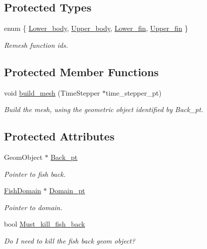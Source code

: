 \subsection*{Protected Types}
\begin{DoxyCompactItemize}
\item 
enum \{ \hyperlink{classoomph_1_1FishMesh_a4a4137c4add890a283e51651c5c47f62a3d3771209da5e9d30eedf957678f24fb}{Lower\+\_\+body}, 
\hyperlink{classoomph_1_1FishMesh_a4a4137c4add890a283e51651c5c47f62aee1779e3610fcc506554edb97df12b81}{Upper\+\_\+body}, 
\hyperlink{classoomph_1_1FishMesh_a4a4137c4add890a283e51651c5c47f62a616ba7504cd0d8970e1e275579f5606d}{Lower\+\_\+fin}, 
\hyperlink{classoomph_1_1FishMesh_a4a4137c4add890a283e51651c5c47f62a773d3896b889d4f05ed5902482650da1}{Upper\+\_\+fin}
 \}\begin{DoxyCompactList}\small\item\em Remesh function ids. \end{DoxyCompactList}
\end{DoxyCompactItemize}
\subsection*{Protected Member Functions}
\begin{DoxyCompactItemize}
\item 
void \hyperlink{classoomph_1_1FishMesh_aabde81364817d938f0924997bf4f63cc}{build\+\_\+mesh} (Time\+Stepper $\ast$time\+\_\+stepper\+\_\+pt)
\begin{DoxyCompactList}\small\item\em Build the mesh, using the geometric object identified by Back\+\_\+pt. \end{DoxyCompactList}\end{DoxyCompactItemize}
\subsection*{Protected Attributes}
\begin{DoxyCompactItemize}
\item 
Geom\+Object $\ast$ \hyperlink{classoomph_1_1FishMesh_a26e8eb98c11d6b45cc3b5c5a8e45b530}{Back\+\_\+pt}
\begin{DoxyCompactList}\small\item\em Pointer to fish back. \end{DoxyCompactList}\item 
\hyperlink{classoomph_1_1FishDomain}{Fish\+Domain} $\ast$ \hyperlink{classoomph_1_1FishMesh_ae18c3154ad99054c073840c6b134c49b}{Domain\+\_\+pt}
\begin{DoxyCompactList}\small\item\em Pointer to domain. \end{DoxyCompactList}\item 
bool \hyperlink{classoomph_1_1FishMesh_ad1dd5a431f711d3ac14498cc6ab4d856}{Must\+\_\+kill\+\_\+fish\+\_\+back}
\begin{DoxyCompactList}\small\item\em Do I need to kill the fish back geom object? \end{DoxyCompactList}\end{DoxyCompactItemize}


